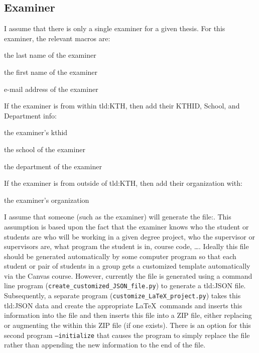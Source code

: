 \subsection{Examiner}
\label{sec:examinerMacros}
I assume that there is only a single examiner for a given thesis. For this examiner, the relevant macros are:
\begin{description}[leftmargin=!, labelwidth =\widthof{\texttt{\textbackslash secondAuthorsFirstname\{\}}}]
\item [\texttt{\textbackslash examinersLastname\{\}}] the last name of the examiner
\item [\texttt{\textbackslash examinersFirstname\{\}}] the first name of the examiner
\item [\texttt{\textbackslash examinersEmail\{\}}] e-mail address of the examiner
\end{description}

If the examiner is from within \gls{tld:KTH}, then add their KTHID, School, and Department info:
\begin{description}[leftmargin=!, labelwidth =\widthof{\texttt{\textbackslash secondAuthorsFirstname\{\}}}]
\item [\texttt{\textbackslash examinersKTHID\{\}}] the examiner's kthid 
\item [\texttt{\textbackslash examinersSchool\{\}}] the school of the examiner
\item [\texttt{\textbackslash examinersDepartment\{\}}] the department of the examiner
\end{description}

If the examiner is from outside of \gls{tld:KTH}, then add their organization with:
\begin{description}[leftmargin=!, labelwidth =\widthof{\texttt{\textbackslash secondAuthorsFirstname\{\}}}]
\item [\texttt{\textbackslash examinersOrganization\{\}}] the examiner's organization
\end{description}


I assume that someone (such as the examiner) will generate the file:\linebreak[4] . This assumption is based upon the fact that the examiner knows who the student or students are who will be working in a given degree project, who the supervisor or supervisors are, what program the student is in, course code, \ldots . Ideally this file should be generated automatically by some computer program so that each student or pair of students in a group gets a customized template automatically via the Canvas course. However, currently the file is generated using a command line program (\texttt{create\_customized\_JSON\_file.py}) to generate a \gls{tld:JSON} file. Subsequently, a separate program (\texttt{customize\_LaTeX\_project.py}) takes this \gls{tld:JSON} data and create the appropriate \LaTeX\ commands and inserts this information into the file and then inserts this file into a ZIP file, either replacing or augmenting the  within this ZIP file (if one exists). There is an option for this second program \texttt{--initialize} that causes the program to simply replace the file rather than appending the new information to the end of the file.

